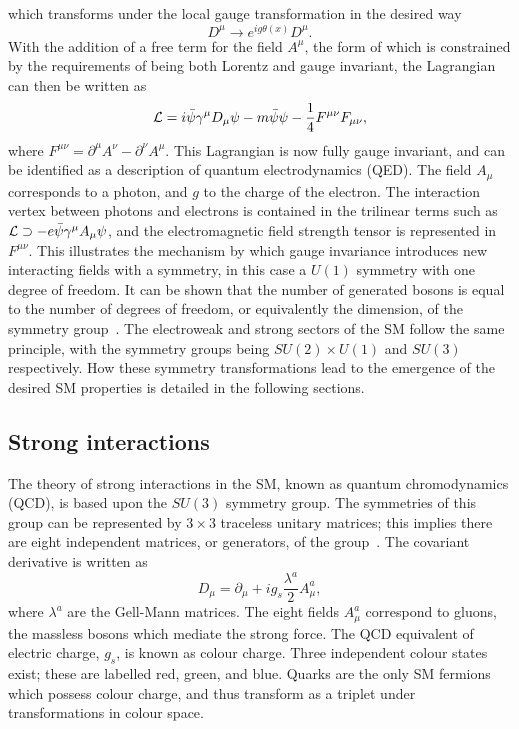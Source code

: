 which transforms under the local gauge transformation in the desired way
\begin{equation}
D^\mu \rightarrow e^{ig\theta(x)} D^\mu .
\end{equation}
With the addition of a free term for the field $A^\mu$, 
the form of which is constrained by the requirements of being both Lorentz and gauge invariant, 
the Lagrangian can then be written as
\begin{equation}
\mathcal{L} = i \bar{\psi} \gamma^\mu D_\mu \psi - m\bar{\psi}\psi - \frac{1}{4} F^{\mu\nu}F_{\mu\nu},
\end{equation}
where $F^{\mu\nu} = \partial^\mu A^\nu - \partial^\nu A^\mu$.
This Lagrangian is now fully gauge invariant, 
and can be identified as a description of quantum electrodynamics (QED).
The field $A_\mu$ corresponds to a photon, and $g$ to the charge of the electron.
The interaction vertex between photons and electrons is contained in the trilinear terms
such as $\mathcal{L} \supset -e \bar{\psi} \gamma^\mu A_\mu \psi$, 
and the electromagnetic field strength tensor is represented in $F^{\mu\nu}$.
This illustrates the mechanism by which gauge invariance introduces new interacting fields
with a symmetry, in this case a $U(1)$ symmetry with one degree of freedom.
It can be shown that the number of generated bosons is equal to the number of degrees of freedom, 
or equivalently the dimension, of the symmetry group~\cite{Peskin}.
The electroweak and strong sectors of the SM follow the same principle, 
with the symmetry groups being $SU(2) \times U(1)$ and $SU(3)$ respectively.
How these symmetry transformations lead to the emergence of the desired SM properties 
is detailed in the following sections.

\subsection{Strong interactions}

The theory of strong interactions in the SM, known as quantum chromodynamics (QCD), 
is based upon the $SU(3)$ symmetry group.
The symmetries of this group can be represented by $3\times3$ traceless unitary matrices;
this implies there are eight independent matrices, or generators, of the group~\cite{Thomson}.
The covariant derivative is written as
\begin{equation}
D_\mu = \partial_\mu + i g_s \frac{\lambda^a}{2} A^a_\mu ,
\end{equation}
where $\lambda^a$ are the Gell-Mann matrices.
The eight fields $A^a_\mu$ correspond to gluons, 
the massless bosons which mediate the strong force.
The QCD equivalent of electric charge, $g_s$, is known as colour charge.
Three independent colour states exist; these are labelled red, green, and blue.
Quarks are the only SM fermions which possess colour charge, 
and thus transform as a triplet under transformations in colour space.

